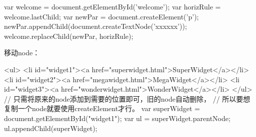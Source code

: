 \documentclass[a4paper,11pt]{article}
\begin{document}
\begin{javascriptcode}
  var welcome = document.getElementById('welcome');
  var horizRule = welcome.lastChild;
  var newPar = document.createElement('p');
  newPar.appendChild(document.createTextNode('xxxxxx'));
  welcome.replaceChild(newPar, horizRule);
\end{javascriptcode}

移动node：

\begin{javascriptcode}
  <ul>
    <li id="widget1"><a href="superwidget.html">SuperWidget</a></li>
    <li id="widget2"><a href="megawidget.html">MegaWidget</a></li>
    <li id="widget3"><a href="wonderwidget.html">WonderWidget</a></li>
  </ul>
  // 只需将原来的node添加到需要的位置即可，旧的node自动删除，
  // 所以要想复制一个node就要使用createElement才行。
  var superWidget = document.getElementById("widget1");
  var ul = superWidget.parentNode;
  ul.appendChild(superWidget);
\end{javascriptcode}
\end{document}
